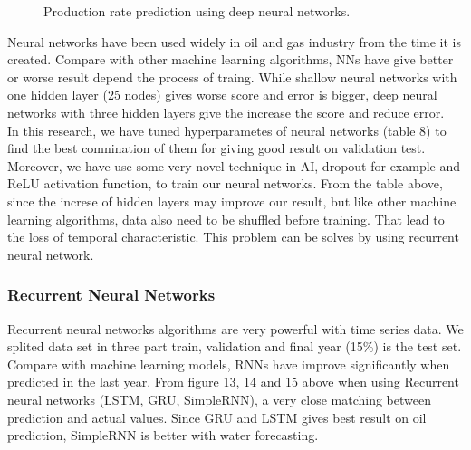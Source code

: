 \documentclass[english]{article}
\makeatletter
\def\maxwidth{\ifdim\Gin@nat@width>\linewidth\linewidth
    \else\Gin@nat@width\fi}
\let\Oldincludegraphics\includegraphics
\renewcommand{\includegraphics}[1]{\Oldincludegraphics[width=.8\maxwidth]{#1}}
\makeatother
\begin{document}
\begin{figure}[H]
     \begin{center}
%
    \end{center}
    \caption{%
        Production rate prediction using deep neural networks.
     }%
   \label{fig:subfigures}
\end{figure}
Neural networks have been used widely in oil and gas industry from the time it is created. Compare with other machine learning algorithms, NNs have give better or worse result depend the process of traing. While shallow neural networks with one hidden layer (25 nodes) gives worse score and error is bigger, deep neural networks with three hidden layers give the  increase the score and reduce error.\\
In this research, we have tuned hyperparametes of neural networks (table 8) to find the best comnination of them for giving good result on validation test. Moreover, we have use some very novel technique in AI, dropout for example and ReLU activation function, to train our neural networks. From the table above, since the increse of hidden layers may improve our result, but like other machine learning algorithms, data also need to be shuffled before training. That lead to the loss of temporal characteristic. This problem can be solves by using recurrent neural network.

\subsubsection{Recurrent Neural Networks}
Recurrent neural networks algorithms are very powerful with time series data. We splited data set in three part train, validation and final year (15\%) is the test set. Compare with machine learning models, RNNs have improve significantly when predicted in the last year. From figure 13, 14 and 15 above when using Recurrent neural networks (LSTM, GRU, SimpleRNN), a very close matching between prediction and actual values. Since GRU and LSTM gives best result on oil prediction, SimpleRNN is better with water forecasting.
\end{document}
